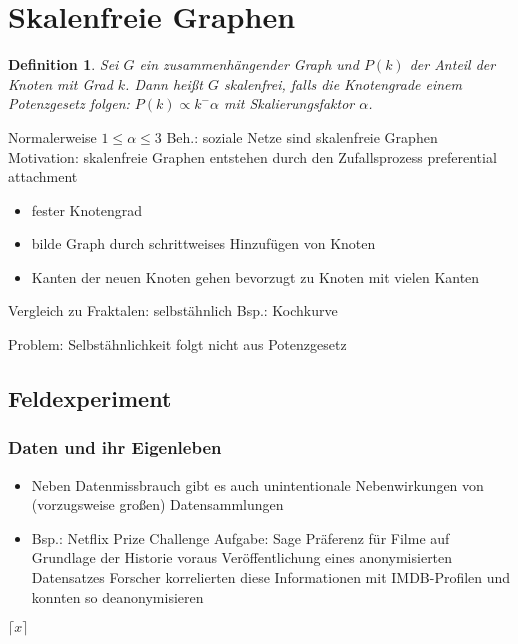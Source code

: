 \documentclass[12pt]{article}
\numberwithin{equation}{subsection}
\newtheorem{df}{Definition}
\begin{document}
\section{Skalenfreie Graphen}
\begin{df}
	Sei $G$ ein zusammenhängender Graph und $P(k)$ der Anteil der Knoten mit Grad $k$. Dann heißt $G$ skalenfrei, falls die Knotengrade einem Potenzgesetz folgen:
	$P(k)\propto k^-\alpha$ mit Skalierungsfaktor $\alpha$.	
\end{df}
Normalerweise $1\leq\alpha\leq3$
Beh.: soziale Netze sind skalenfreie Graphen
Motivation:
skalenfreie Graphen entstehen durch den Zufallsprozess preferential attachment
\begin{itemize}
	\item fester Knotengrad
	\item bilde Graph durch schrittweises Hinzufügen von Knoten
	\item Kanten der neuen Knoten gehen bevorzugt zu Knoten mit vielen Kanten
\end{itemize}
Vergleich zu Fraktalen:
selbstähnlich
Bsp.: Kochkurve
Problem: Selbstähnlichkeit folgt nicht aus Potenzgesetz
\subsection{Feldexperiment}
\subsubsection{Daten und ihr Eigenleben}
\begin{itemize}
	\item Neben Datenmissbrauch gibt es auch unintentionale Nebenwirkungen von (vorzugsweise großen) Datensammlungen
	\item Bsp.: Netflix Prize Challenge
	\subitem\to Aufgabe: Sage Präferenz für Filme auf Grundlage der Historie voraus
	\subitem\to Veröffentlichung eines anonymisierten Datensatzes
	\subitem\to Forscher korrelierten diese Informationen mit IMDB-Profilen und konnten so deanonymisieren
\end{itemize}
$\lceil x\rceil$
\end{document}
